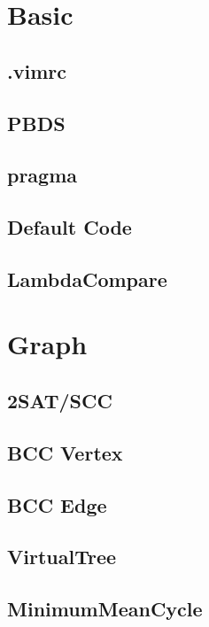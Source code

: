 \section{Basic}
\subsection{.vimrc}

\subsection{PBDS}

\subsection{pragma}

\subsection{Default Code}

\subsection{LambdaCompare}

\section{Graph}
\subsection{2SAT/SCC}

\subsection{BCC Vertex}

\subsection{BCC Edge}

\subsection{VirtualTree}

\subsection{MinimumMeanCycle}


